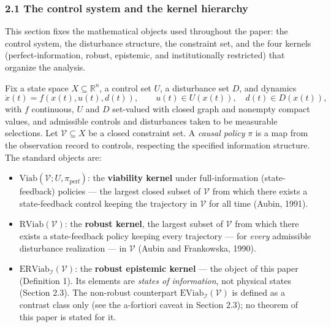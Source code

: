 \documentclass[11pt]{article}
\providecommand{\tightlist}{\setlength{\itemsep}{0pt}\setlength{\parskip}{0pt}}
\begin{document}
\subsubsection{2.1 The control system and the kernel
hierarchy}\label{the-control-system-and-the-kernel-hierarchy}

This section fixes the mathematical objects used throughout the paper:
the control system, the disturbance structure, the constraint set, and
the four kernels (perfect-information, robust, epistemic, and
institutionally restricted) that organize the analysis.

Fix a state space \(X \subseteq \mathbb{R}^n\), a control set \(U\), a
disturbance set \(D\), and dynamics
\[\dot x(t) = f(x(t), u(t), d(t)), \qquad u(t) \in U(x(t)), \quad d(t) \in D(x(t)),\]
with \(f\) continuous, \(U\) and \(D\) set-valued with closed graph and
nonempty compact values, and admissible controls and disturbances taken
to be measurable selections. Let \(\mathcal{V} \subseteq X\) be a closed
constraint set. A \emph{causal policy} \(\pi\) is a map from the
observation record to controls, respecting the specified information structure. The standard objects are:

\begin{itemize}
\tightlist
\item
  \(\mathrm{Viab}(\mathcal{V}; U, \pi_{\mathrm{perf}})\): the
  \textbf{viability kernel} under full-information (state-feedback)
  policies --- the largest closed subset of \(\mathcal{V}\) from which
  there exists a state-feedback control keeping the trajectory in
  \(\mathcal{V}\) for all time (Aubin, 1991).
\item
  \(\mathrm{RViab}(\mathcal{V})\): the \textbf{robust kernel}, the
  largest subset of \(\mathcal{V}\) from which there exists a
  state-feedback policy keeping every trajectory --- for \emph{every}
  admissible disturbance realization --- in \(\mathcal{V}\) (Aubin and
  Frankowska, 1990).
\item
  \(\mathrm{ERViab}_{\mathcal{I}}(\mathcal{V})\): the \textbf{robust
  epistemic kernel} --- the object of this paper (Definition 1). Its
  elements are \emph{states of information}, not physical states
  (Section 2.3). The non-robust counterpart
  \(\mathrm{EViab}_{\mathcal{I}}(\mathcal{V})\) is defined as a contrast class only (see the a-fortiori caveat in Section 2.3); no theorem of this paper is stated for it.
\end{itemize}
\end{document}
